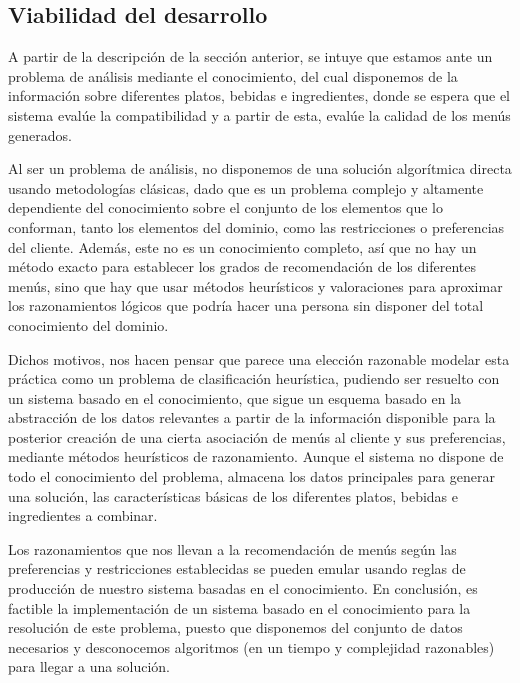 \documentclass{article}
\begin{document}
\subsection{Viabilidad del desarrollo}
A partir de la descripción de la sección anterior, se intuye que estamos ante un problema de análisis mediante el conocimiento, del cual disponemos de la información sobre diferentes platos, bebidas e ingredientes, donde se espera que el sistema evalúe la compatibilidad y a partir de esta, evalúe la calidad de los menús generados.
\par
Al ser un problema de análisis, no disponemos de una solución algorítmica directa usando metodologías clásicas, dado que es un problema complejo y altamente dependiente del conocimiento sobre el conjunto de los elementos que lo conforman, tanto los elementos del dominio, como las restricciones o preferencias del cliente.
Además, este no es un conocimiento completo, así que no hay un método exacto para establecer los grados de recomendación de los diferentes menús, sino que hay que usar métodos heurísticos y valoraciones para aproximar los razonamientos lógicos que podría hacer una persona sin disponer del total conocimiento del dominio.
\par
Dichos motivos, nos hacen pensar que parece una elección razonable modelar esta práctica como un problema de clasificación heurística, pudiendo ser resuelto con un sistema basado en el conocimiento, que sigue un esquema basado en la abstracción de los datos relevantes a partir de la información disponible para la posterior creación de una cierta asociación de menús al cliente y sus preferencias, mediante métodos heurísticos de razonamiento. Aunque el sistema no dispone de todo el conocimiento del problema, almacena los datos principales para generar una solución, las características básicas de los diferentes platos, bebidas e ingredientes a combinar.
\par
Los razonamientos que nos llevan a la recomendación de menús según las preferencias y restricciones establecidas se pueden emular usando reglas de producción de nuestro sistema basadas en el conocimiento. En conclusión, es factible la implementación de un sistema basado en el conocimiento para la resolución de este problema, puesto que disponemos del conjunto de datos necesarios y desconocemos algoritmos (en un tiempo y complejidad razonables) para llegar a una solución.
\end{document}

